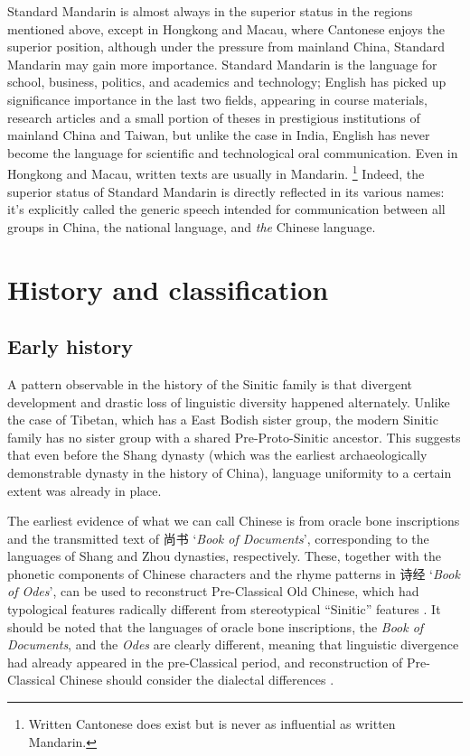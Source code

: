 \documentclass[UTF8, a4paper, oneside, scheme=plain, 12pt]{ctexrep}
\newcommand*{\citepages}[1]{pp.~{#1}}
\newcommand{\work}[1]{\textit{#1}}
\newcommand{\translate}[1]{`#1'}
\begin{document}
Standard Mandarin is almost always in the superior status 
in the regions mentioned above,
except in Hongkong and Macau, 
where Cantonese enjoys the superior position,
although under the pressure from mainland China, 
Standard Mandarin may gain more importance.
Standard Mandarin is the language for school, business, politics, 
and academics and technology; 
English has picked up significance importance in the last two fields,
appearing in course materials, research articles and a small portion of theses 
in prestigious institutions of mainland China and Taiwan,
but unlike the case in India,
English has never become the language
for scientific and technological oral communication.
Even in Hongkong and Macau, 
written texts are usually in Mandarin.%
\footnote{
    Written Cantonese does exist but is never as influential as written Mandarin.
}
Indeed, the superior status of Standard Mandarin is directly reflected in its various names: 
it's explicitly called the generic speech intended for 
communication between all groups in China, 
the national language, 
and \emph{the} Chinese language.

\section{History and classification}

\subsection{Early history}

A pattern observable in the history of the Sinitic family is that divergent development and drastic loss of linguistic diversity happened alternately.
Unlike the case of Tibetan, which has a East Bodish sister group,
the modern Sinitic family has no sister group with a shared Pre-Proto-Sinitic ancestor.
This suggests that even before the Shang dynasty (which was the earliest archaeologically demonstrable dynasty in the history of China),
language uniformity to a certain extent was already in place.

The earliest evidence of what we can call Chinese is from 
oracle bone inscriptions and the transmitted text of 尚书 \translate{\work{Book of Documents}},
corresponding to the languages of Shang and Zhou dynasties, respectively.
These, together with the phonetic components of Chinese characters
and the rhyme patterns in 诗经 \translate{\work{Book of Odes}},
can be used to reconstruct Pre-Classical Old Chinese,
which had typological features radically different from stereotypical ``Sinitic'' features
\citep{baxter2014old}.
It should be noted that the languages of oracle bone inscriptions,
the \work{Book of Documents}, and the \work{Odes} are clearly different,
meaning that linguistic divergence had already appeared in the pre-Classical period,
and reconstruction of Pre-Classical Chinese should consider the dialectal differences
\citep[\citepages{478-9}]{harbsmeier2016irrefutable}.
\end{document}
